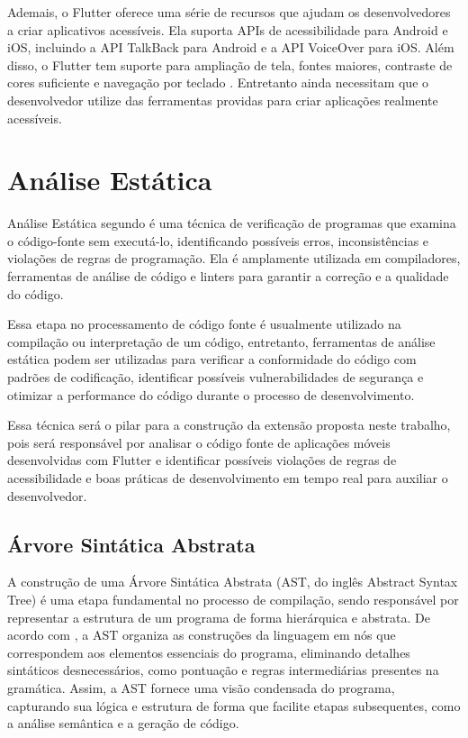 Ademais, o Flutter oferece uma série de recursos que ajudam os desenvolvedores a criar aplicativos acessíveis. Ela suporta APIs de acessibilidade para Android e iOS, incluindo a API TalkBack para Android e a API VoiceOver para iOS. Além disso, o Flutter tem suporte para ampliação de tela, fontes maiores, contraste de cores suficiente e navegação por teclado \cite{flutter}. Entretanto ainda necessitam que o desenvolvedor utilize das ferramentas providas para criar aplicações realmente acessíveis.

\section{Análise Estática}

Análise Estática segundo \cite{interpreters} é uma técnica de verificação de programas que examina o código-fonte sem executá-lo, identificando possíveis erros, inconsistências e violações de regras de programação. Ela é amplamente utilizada em compiladores, ferramentas de análise de código e linters para garantir a correção e a qualidade do código.

Essa etapa no processamento de código fonte é usualmente utilizado na compilação ou interpretação de um código, entretanto, ferramentas de análise estática podem ser utilizadas para verificar a conformidade do código com padrões de codificação, identificar possíveis vulnerabilidades de segurança e otimizar a performance do código durante o processo de desenvolvimento.

Essa técnica será o pilar para a construção da extensão proposta neste trabalho, pois será responsável por analisar o código fonte de aplicações móveis desenvolvidas com Flutter e identificar possíveis violações de regras de acessibilidade e boas práticas de desenvolvimento em tempo real para auxiliar o desenvolvedor.

\subsection{Árvore Sintática Abstrata}

A construção de uma Árvore Sintática Abstrata (AST, do inglês Abstract Syntax Tree) é uma etapa fundamental no processo de compilação, sendo responsável por representar a estrutura de um programa de forma hierárquica e abstrata. De acordo com \cite{compiladores}, a AST organiza as construções da linguagem em nós que correspondem aos elementos essenciais do programa, eliminando detalhes sintáticos desnecessários, como pontuação e regras intermediárias presentes na gramática. Assim, a AST fornece uma visão condensada do programa, capturando sua lógica e estrutura de forma que facilite etapas subsequentes, como a análise semântica e a geração de código.

